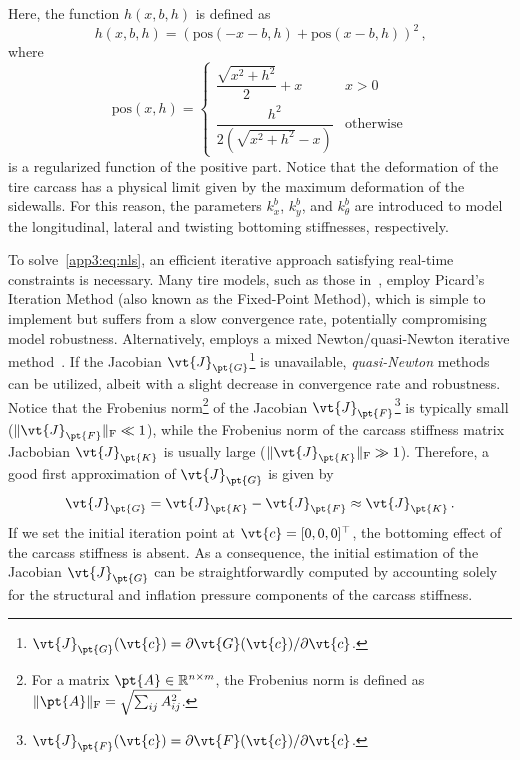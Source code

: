 %
Here, the function $h(x,b,h)$ is defined as
%
\begin{equation}
  h(x,b,h) = \left(\mathrm{pos}(-x-b, h) + \mathrm{pos}(x-b, h)\right)^2 \, \text{,}
\end{equation}
%
where
%
\begin{equation}
  \mathrm{pos}(x,h) =
  \begin{cases}
    \dfrac{\sqrt{x^2 + h^2}}{2}+x    & x > 0 \\[0.5em]
    \dfrac{h^2}{2(\sqrt{x^2+h^2}-x)} & \mathrm{otherwise}
  \end{cases}
\end{equation}
%
is a regularized function of the positive part. Notice that the deformation of the tire carcass has a physical limit given by the maximum deformation of the sidewalls. For this reason, the parameters $k_x^b$, $k_y^b$, and $k_\theta^b$ are introduced to model the longitudinal, lateral and twisting bottoming stiffnesses, respectively.

To solve~\eqref{app3:eq:nls}, an efficient iterative approach satisfying real-time constraints is necessary. Many tire models, such as those in~\cite{gruber2012normalI, gruber2012normalII, miyashita2010tire, miyashita2003analytical, miyashita2006new, kabe2006new, miyashita2015study}, employ Picard's Iteration Method (also known as the Fixed-Point Method), which is simple to implement but suffers from a slow convergence rate, potentially compromising model robustness. Alternatively, \TaMeTire{} employs a mixed Newton/quasi-Newton iterative method~\cite{fevrier2013method}. If the Jacobian $\vt{J}_\pt{G}$\footnote{$\vt{J}_\pt{G}(\vt{c}) = \partial\vt{G}(\vt{c})/\partial\vt{c}$.} is unavailable, \emph{quasi-Newton} methods can be utilized, albeit with a slight decrease in convergence rate and robustness. Notice that the Frobenius norm\footnote{For a matrix $\pt{A}\in\mathbb{R}^{n \times m}$, the Frobenius norm is defined as $\|\pt{A}\|_\mathrm{F}=\sqrt{\sum_{ij}A_{ij}^2}$.} of the Jacobian $\vt{J}_\pt{F}$\footnote{$\vt{J}_\pt{F}(\vt{c}) = \partial\vt{F}(\vt{c})/\partial\vt{c}$.} is typically small ($\|\vt{J}_\pt{F}\|_\mathrm{F} \ll 1$), while the Frobenius norm of the carcass stiffness matrix Jacbobian $\vt{J}_\pt{K}$ is usually large ($\|\vt{J}_\pt{K}\|_\mathrm{F} \gg 1$). Therefore, a good first approximation of $\vt{J}_\pt{G}$ is given by
%
\begin{equation}
  \vt{J}_\pt{G} = \vt{J}_\pt{K} - \vt{J}_\pt{F} \approx \vt{J}_\pt{K} \, \text{.}
  \label{app3:eq:jacobian_approx}
\end{equation}
%
If we set the initial iteration point at $\vt{c} = [0,0,0]^\top$, the bottoming effect of the carcass stiffness is absent. As a consequence, the initial estimation of the Jacobian $\vt{J}_\pt{G}$ can be straightforwardly computed by accounting solely for the structural and inflation pressure components of the carcass stiffness.

